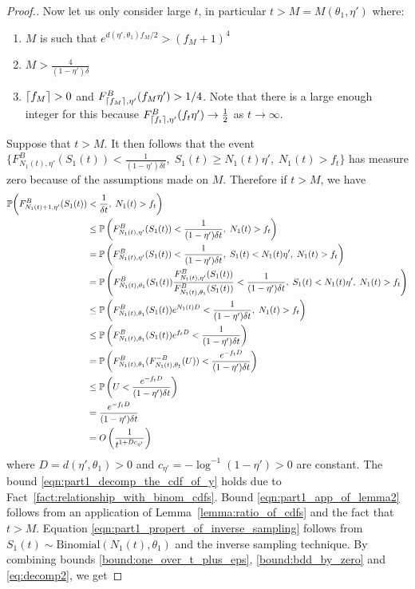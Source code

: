 \begin{proof}[Proof.]
	Now let us only consider large $t$, in particular $t > M = M(\theta_1, \eta')$ where:
	\begin{enumerate}
		\item $M$ is such that $e^{d(\eta', \theta_1)f_{M}/2} > (f_M + 1)^4$
		\item $M > \frac{4}{(1-\eta')\delta }$
		\item $\ceil{f_M} > 0$ and $F^B_{\ceil{f_M},\eta'}(f_M \eta') > 1/4$. Note that there is a large enough integer for this because $F^B_{\ceil{f_t},\eta'}(f_t \eta') \to \frac{1}{2}$ as $t \to \infty$.
	\end{enumerate} 
	Suppose that $t > M$. It then follows that the event $\{F^B_{N_1(t), \eta'}(S_1(t)) < \frac{1}{(1-\eta')\delta t},\; S_1(t) \ge N_1(t) \eta', \; N_1(t) > f_t\}$ has measure zero because of the assumptions made on $M$. Therefore if $t > M$, we have
	\begin{align}
	\mathbb{P}\bigg(F^B_{N_1(t)+1,  \eta'}(S_1(t)) &< \frac{1}{\delta t }  , \; N_1(t) > f_t \bigg) \nonumber \\
	& \le \P{F^B_{N_1(t),  \eta'}(S_1(t)) < \frac{1}{(1-\eta')\delta t}, \; N_1(t) > f_t} \label{eqn:part1_decomp_the_cdf_of_y} \\ 
	& = \P{F^B_{N_1(t),  \eta'}(S_1(t)) < \frac{1}{(1-\eta')\delta t}, \; S_1(t) < N_1(t) \eta', \; N_1(t) > f_t} \nonumber \\ 
	& =  \P{F^B_{N_1(t),\theta_1}(S_1(t)) \frac{F^B_{N_1(t),\eta'}(S_1(t))}{F^B_{N_1(t),\theta_1}(S_1(t))} < \frac{1}{(1-\eta')\delta  t}, \;S_1(t) < N_1(t) \eta', \; N_1(t) > f_t} \nonumber \\
	& \le  \P{F_{N_1(t),\theta_1}^B(S_1(t))  e^{N_1(t) D} < \frac{1}{(1-\eta')\delta  t} , \; N_1(t) > f_t} \label{eqn:part1_app_of_lemma2} \\
	& \le  \P{F_{N_1(t),\theta_1}^B(S_1(t)) e^{f_t D} < \frac{1}{(1-\eta')\delta  t}} \nonumber \\
	& =  \P{F_{N_1(t),\theta_1}^B(F^{-B}_{N_1(t),\theta_1}(U)) < \frac{e^{-f_t D}}{(1-\eta')\delta  t} } \label{eqn:part1_propert_of_inverse_sampling}\\
	& \le  \P{U < \frac{e^{-f_t D}}{(1-\eta')\delta  t} } \nonumber \\  
	& =  \frac{e^{-f_t D}}{(1-\eta')\delta  t} \nonumber  \nonumber\\
	& = O\left( \frac{1}{t^{1+Dc_{\eta'}}} \right)  \label{bound:one_over_t_plus_eps} 
	\end{align}
	where $D = d(\eta',\theta_1) > 0$ and $c_{\eta'} = -\log^{-1}(1-\eta') > 0$ are constant. The bound \eqref{eqn:part1_decomp_the_cdf_of_y} holds due to Fact~\eqref{fact:relationship_with_binom_cdfs}. Bound \eqref{eqn:part1_app_of_lemma2} follows from an application of Lemma~\ref{lemma:ratio_of_cdfs} and the fact that $t > M$. Equation \eqref{eqn:part1_propert_of_inverse_sampling} follows from $S_1(t) \sim \text{Binomial}(N_1(t), \theta_1)$ and the inverse sampling technique. By combining bounds \eqref{bound:one_over_t_plus_eps}, \eqref{bound:bdd_by_zero} and \eqref{eq:decomp2}, we get

\end{proof}
